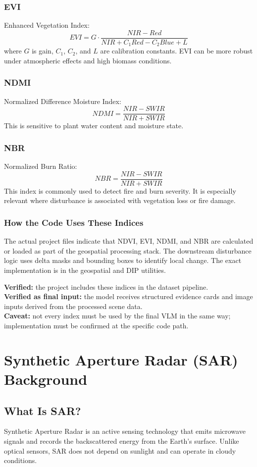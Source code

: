 \documentclass[11pt]{article}
\newcommand{\status}[1]{\textbf{#1}}
\begin{document}
\subsubsection{EVI}
Enhanced Vegetation Index:
\[
EVI = G \cdot \frac{NIR - Red}{NIR + C_1 Red - C_2 Blue + L}
\]
where \(G\) is gain, \(C_1\), \(C_2\), and \(L\) are calibration constants. EVI can be more robust under atmospheric effects and high biomass conditions.

\subsubsection{NDMI}
Normalized Difference Moisture Index:
\[
NDMI = \frac{NIR - SWIR}{NIR + SWIR}
\]
This is sensitive to plant water content and moisture state.

\subsubsection{NBR}
Normalized Burn Ratio:
\[
NBR = \frac{NIR - SWIR}{NIR + SWIR}
\]
This index is commonly used to detect fire and burn severity. It is especially relevant where disturbance is associated with vegetation loss or fire damage.

\subsubsection{How the Code Uses These Indices}
The actual project files indicate that NDVI, EVI, NDMI, and NBR are calculated or loaded as part of the geospatial processing stack. The downstream disturbance logic uses delta masks and bounding boxes to identify local change. The exact implementation is in the geospatial and DIP utilities.

\status{Verified:} the project includes these indices in the dataset pipeline.\\
\status{Verified as final input:} the model receives structured evidence cards and image inputs derived from the processed scene data.\\
\status{Caveat:} not every index must be used by the final VLM in the same way; implementation must be confirmed at the specific code path.

\section{Synthetic Aperture Radar (SAR) Background}

\subsection{What Is SAR?}
Synthetic Aperture Radar is an active sensing technology that emits microwave signals and records the backscattered energy from the Earth’s surface. Unlike optical sensors, SAR does not depend on sunlight and can operate in cloudy conditions.
\end{document}
